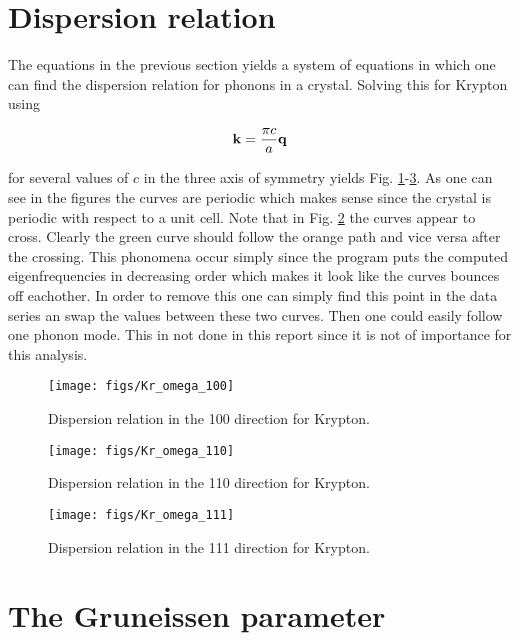 \section{Dispersion relation}

The equations in the previous section yields a system of equations in which one can find the dispersion relation for phonons in a crystal. Solving this for Krypton using

\begin{equation*}
  \mathbf{k} = \frac{\pi c}{a}\mathbf{q}
\end{equation*}

for several values of $c$ in the three axis of symmetry yields Fig. \ref{fig:100}-\ref{fig:111}. As one can see in the figures the curves are periodic which makes sense since the crystal is periodic with respect to a unit cell. Note that in Fig. \ref{fig:110} the curves appear to cross. Clearly the green curve should follow the orange path and vice versa after the crossing. This phonomena occur simply since the program puts the computed eigenfrequencies in decreasing order which makes it look like the curves bounces off eachother. In order to remove this one can simply find this point in the data series an swap the values between these two curves. Then one could easily follow one phonon mode. This in not done in this report since it is not of importance for this analysis.


\begin{figure}[H]
  \centering
  \texttt{[image: figs/Kr\_omega\_100]}
  \caption{Dispersion relation in the 100 direction for Krypton.}
  \label{fig:100}
\end{figure}

\begin{figure}[H]
  \centering
  \texttt{[image: figs/Kr\_omega\_110]}
  \caption{Dispersion relation in the 110 direction for Krypton.}
  \label{fig:110}
\end{figure}

\begin{figure}[H]
  \centering
  \texttt{[image: figs/Kr\_omega\_111]}
  \caption{Dispersion relation in the 111 direction for Krypton.}
  \label{fig:111}
\end{figure}

\section{The Gruneissen parameter}

